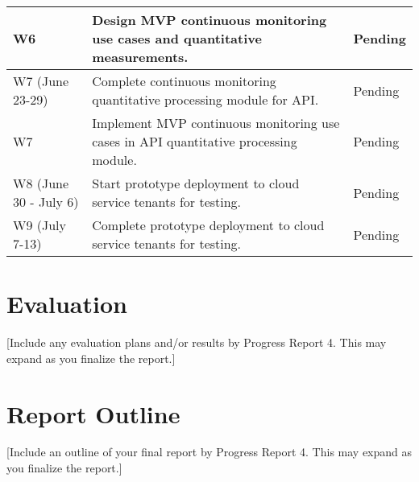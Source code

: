 \documentclass{jdf}
\begin{document}
\begin{xltabular}{\textwidth}{|l|X|l|}
    \hline
    W6 & Design MVP continuous monitoring use cases and quantitative measurements. & Pending \\
    \hline
    W7 (June 23-29) & Complete continuous monitoring quantitative processing module for API. & Pending \\
    \hline
    W7 & Implement MVP continuous monitoring use cases in API quantitative processing module. & Pending \\
    \hline    
    W8 (June 30 - July 6) & Start prototype deployment to cloud service tenants for testing. & Pending \\
    \hline
    W9 (July 7-13) & Complete prototype deployment to cloud service tenants for testing. & Pending \\
    \hline
\end{xltabular}

\section*{Evaluation}

[Include any evaluation plans and/or results by Progress Report 4. This may expand as you finalize the report.]

\section*{Report Outline}

[Include an outline of your final report by Progress Report 4. This may expand as you finalize the report.]

\nocite{*}



\section*{}



\label{appendix:outline}

\end{document}

